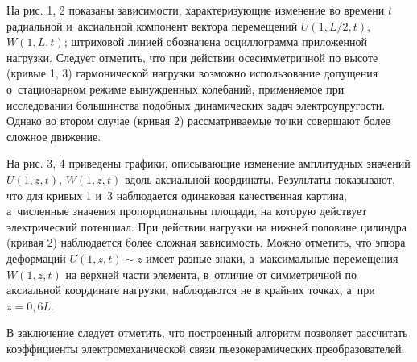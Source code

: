 

На рис. 1, 2 показаны зависимости, характеризующие изменение во времени $t$ радиальной и~аксиальной компонент вектора перемещений $U(1, L /2, t)$, $W(1, L, t)$;  штриховой линией обозначена осциллограмма приложенной нагрузки. 
Следует отметить, что при действии осесимметричной по высоте (кривые 1, 3) гармонической нагрузки возможно использование допущения о~стационарном режиме вынужденных колебаний,  применяемое при исследовании большинства подобных динамических задач  электроупругости. 
Однако во втором случае (кривая 2) рассматриваемые  точки совершают более сложное движение.








На рис. 3, 4 приведены графики, описывающие изменение амплитудных значений $U(1, z, t)$, $W(1, z, t)$ вдоль аксиальной координаты. 
Результаты показывают, что для кривых 1 и~3 наблюдается одинаковая качественная картина, а~численные значения пропорциональны площади, на которую действует электрический потенциал. 
При действии нагрузки на нижней половине цилиндра (кривая 2) наблюдается более сложная зависимость. 
Можно отметить, что эпюра деформаций $U(1, z, t) \sim z$ имеет разные знаки, а~максимальные перемещения $W(1, z, t)$ на верхней части элемента, в~отличие от симметричной по аксиальной координате нагрузки, наблюдаются не в крайних точках, а~при $z=0,6L$.



В заключение следует отметить, что построенный алгоритм позволяет рассчитать коэффициенты электромеханической связи пьезокерамических \linebreak преобразователей. 


